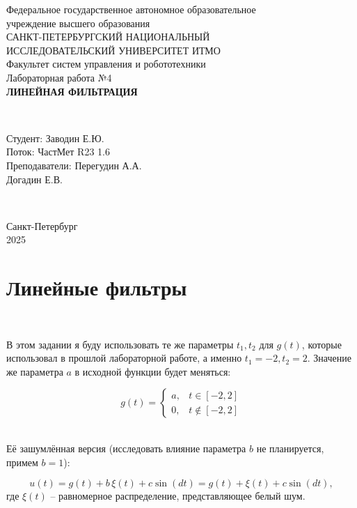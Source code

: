 \documentclass[a4paper]{article}
\begin{document}
\begin{titlepage}
    \begin{center}
        Федеральное государственное автономное образовательное \\ учреждение высшего образования \\[6pt]
        САНКТ-ПЕТЕРБУРГСКИЙ НАЦИОНАЛЬНЫЙ \\ ИССЛЕДОВАТЕЛЬСКИЙ УНИВЕРСИТЕТ ИТМО \\[16pt]
        Факультет систем управления и робототехники \\[26em]
        Лабораторная работа №4 \\[0.5em]
        \textbf{ЛИНЕЙНАЯ ФИЛЬТРАЦИЯ}
    \end{center}\,\\[10em]
    \begin{flushright}
        Студент: Заводин Е.Ю.\\
        Поток: ЧастМет R23 1.6 \\[0.5em]
        Преподаватели: Перегудин А.А.\\
        Догадин Е.В.
    \end{flushright}\,\\[6em]
    \begin{center}
        {\small Санкт-Петербург \\ 2025}
    \end{center}
\end{titlepage}
\setcounter{page}{2}
\tableofcontents\newpage

\section{Линейные фильтры}\

В этом задании я буду использовать те же параметры $t_1, t_2$ для $g(t)$, которые использовал в прошлой лабораторной работе, а именно $t_1 = -2, t_2 = 2$. Значение же параметра $a$ в исходной функции будет меняться:

$$
g(t) = \begin{cases}
    a, &  t \in [-2, 2] \\
    0, &  t \notin [-2, 2]
\end{cases}
$$\ 

Её зашумлённая версия (исследовать влияние параметра $b$ не планируется, примем $b = 1$):

$$u(t) = g(t) + b \,\xi{(t)} + c \sin{(dt)} = g(t) + \xi{(t)} + c \sin{(dt)},$$
где $\xi{(t)}$ -- равномерное распределение, представляющее белый шум.
\end{document}
